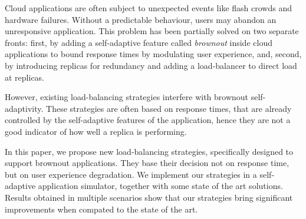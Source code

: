 Cloud applications are often subject to unexpected events like flash crowds
and hardware failures. Without a predictable behaviour, users may abandon
an unresponsive application.
This problem has been partially solved on two separate fronts:
first, by adding a self-adaptive feature called \emph{brownout} inside cloud applications to bound response times by modulating user experience, and, second,
by introducing replicas for redundancy and adding a load-balancer to direct load at replicas.

However, existing load-balancing strategies interfere with brownout self-adaptivity.
These strategies are often based on response times, that
are already controlled by the self-adaptive features of the application, hence they are
not a good indicator of how well a replica is performing.

In this paper, we propose new load-balancing strategies, specifically
designed to support brownout applications. They base their decision not on
response time, but on user experience degradation.
We implement our strategies in a self-adaptive
application simulator, together with some state of the art
solutions. Results obtained in multiple
scenarios show that our strategies bring significant improvements when
compated to the state of the art.
